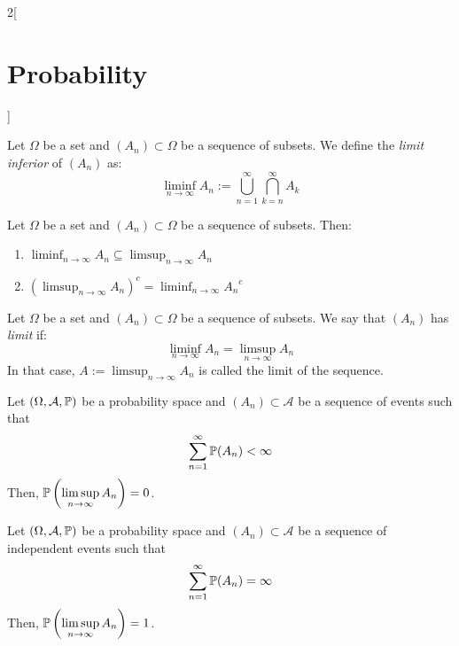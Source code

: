 \documentclass[../../../main.tex]{subfiles}
\begin{document}
\begin{multicols}{2}[\section{Probability}]
\begin{definition}
    \end{definition}
    \begin{definition}
        Let $\Omega$ be a set and $(A_n)\subset\Omega$ be a sequence of subsets. We define the \textit{limit inferior} of $(A_n)$ as: $$\liminf_{n\to\infty}A_n:=\bigcup_{n=1}^\infty\bigcap_{k=n}^\infty A_k$$
    \end{definition}
    \begin{prop}
        Let $\Omega$ be a set and $(A_n)\subset\Omega$ be a sequence of subsets. Then:
        \begin{enumerate}
            \item $\displaystyle\liminf_{n\to\infty}A_n\subseteq\limsup_{n\to\infty}A_n$
            \item $\displaystyle{\left(\limsup_{n\to\infty}A_n\right)}^c=\liminf_{n\to\infty}{A_n}^c$
        \end{enumerate}
    \end{prop}
    \begin{definition}
        Let $\Omega$ be a set and $(A_n)\subset\Omega$ be a sequence of subsets. We say that $(A_n)$ has \textit{limit} if: $$\liminf_{n\to\infty}A_n=\limsup_{n\to\infty}A_n$$
        In that case, $\displaystyle A:=\limsup_{n\to\infty}A_n$ is called the limit of the sequence.
    \end{definition}
    \begin{lemma}
        Let $(\Omega,\mathcal{A},\mathbb{P})$ be a probability space and $(A_n)\subset\mathcal{A}$ be a sequence of events such that $$\sum_{n=1}^\infty\mathbb{P}(A_n)<\infty$$
        Then, $\displaystyle\mathbb{P}\left(\limsup_{n\to\infty} A_n\right)=0$.
    \end{lemma}
    \begin{lemma}
        Let $(\Omega,\mathcal{A},\mathbb{P})$ be a probability space and $(A_n)\subset\mathcal{A}$ be a sequence of independent events such that $$\sum_{n=1}^\infty\mathbb{P}(A_n)=\infty$$
        Then, $\displaystyle\mathbb{P}\left(\limsup_{n\to\infty} A_n\right)=1$.
    \end{lemma}

\end{multicols}
\end{document}

